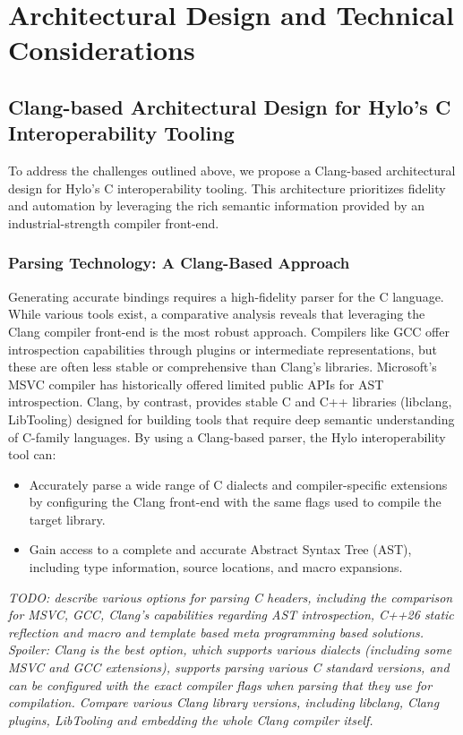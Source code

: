 \section{Architectural Design and Technical Considerations}
\label{sec:architectural_design}


\subsection{Clang-based Architectural Design for Hylo's C Interoperability Tooling}

To address the challenges outlined above, we propose a Clang-based architectural design for Hylo's C interoperability tooling. This architecture prioritizes fidelity and automation by leveraging the rich semantic information provided by an industrial-strength compiler front-end.

\subsubsection{Parsing Technology: A Clang-Based Approach}

Generating accurate bindings requires a high-fidelity parser for the C language. While various tools exist, a comparative analysis reveals that leveraging the Clang compiler front-end is the most robust approach. Compilers like GCC offer introspection capabilities through plugins or intermediate representations, but these are often less stable or comprehensive than Clang's libraries. Microsoft's MSVC compiler has historically offered limited public APIs for AST introspection.
Clang, by contrast, provides stable C and C++ libraries (libclang, LibTooling) designed for building tools that require deep semantic understanding of C-family languages. By using a Clang-based parser, the Hylo interoperability tool can:

\begin{itemize}
    \item Accurately parse a wide range of C dialects and compiler-specific extensions by configuring the Clang front-end with the same flags used to compile the target library.
    \item Gain access to a complete and accurate Abstract Syntax Tree (AST), including type information, source locations, and macro expansions.
\end{itemize}

\textit{TODO: describe various options for parsing C headers, including the comparison for MSVC, GCC, Clang's capabilities regarding AST introspection, C++26 static reflection and macro and template based meta programming based solutions. Spoiler: Clang is the best option, which supports various dialects (including some MSVC and GCC extensions), supports parsing various C standard versions, and can be configured with the exact compiler flags when parsing that they use for compilation. Compare various Clang library versions, including libclang, Clang plugins, LibTooling and embedding the whole Clang compiler itself.
}

